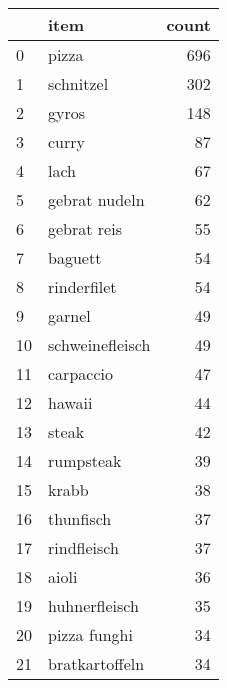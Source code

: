 \begin{tabular}{llr}
\toprule
{} &                                               item &  count \\
\midrule
0    &                                              pizza &    696 \\
1    &                                          schnitzel &    302 \\
2    &                                              gyros &    148 \\
3    &                                              curry &     87 \\
4    &                                               lach &     67 \\
5    &                                      gebrat nudeln &     62 \\
6    &                                        gebrat reis &     55 \\
7    &                                            baguett &     54 \\
8    &                                        rinderfilet &     54 \\
9    &                                             garnel &     49 \\
10   &                                    schweinefleisch &     49 \\
11   &                                          carpaccio &     47 \\
12   &                                             hawaii &     44 \\
13   &                                              steak &     42 \\
14   &                                          rumpsteak &     39 \\
15   &                                              krabb &     38 \\
16   &                                          thunfisch &     37 \\
17   &                                        rindfleisch &     37 \\
18   &                                              aioli &     36 \\
19   &                                      huhnerfleisch &     35 \\
20   &                                       pizza funghi &     34 \\
21   &                                     bratkartoffeln &     34 \\

\end{tabular}
